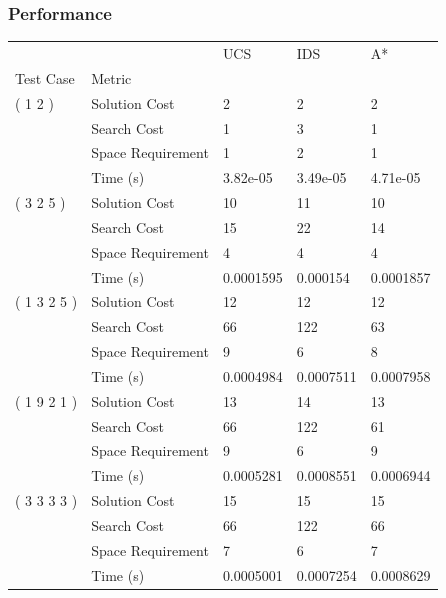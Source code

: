 \documentclass[12pt]{diazessay}
\begin{document}
        \subsubsection{Performance}
\begin{tabular}{lllll}
\toprule
            &                            &        UCS &        IDS &         A* \\
Test Case & Metric &            &            &            \\
\midrule
( 1 2 ) & Solution Cost &          2 &          2 &          2 \\
            & Search Cost &          1 &          3 &          1 \\
            & Space Requirement &          1 &          2 &          1 \\
            & Time (s) &   3.82e-05 &   3.49e-05 &   4.71e-05 \\
( 3 2 5 ) & Solution Cost &         10 &         11 &         10 \\
            & Search Cost &         15 &         22 &         14 \\
            & Space Requirement &          4 &          4 &          4 \\
            & Time (s) &  0.0001595 &   0.000154 &  0.0001857 \\
( 1 3 2 5 ) & Solution Cost &         12 &         12 &         12 \\
            & Search Cost &         66 &        122 &         63 \\
            & Space Requirement &          9 &          6 &          8 \\
            & Time (s) &  0.0004984 &  0.0007511 &  0.0007958 \\
( 1 9 2 1 ) & Solution Cost &         13 &         14 &         13 \\
            & Search Cost &         66 &        122 &         61 \\
            & Space Requirement &          9 &          6 &          9 \\
            & Time (s) &  0.0005281 &  0.0008551 &  0.0006944 \\
( 3 3 3 3 ) & Solution Cost &         15 &         15 &         15 \\
            & Search Cost &         66 &        122 &         66 \\
            & Space Requirement &          7 &          6 &          7 \\
            & Time (s) &  0.0005001 &  0.0007254 &  0.0008629 \\
\bottomrule
\end{tabular}
\end{document}
